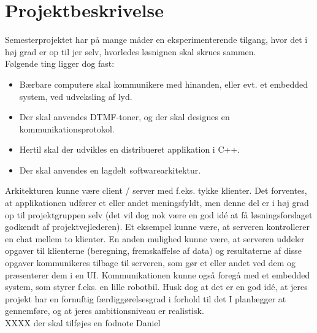 \section{Projektbeskrivelse}
Semesterprojektet har på mange måder en eksperimenterende tilgang, hvor det i høj grad er op til jer selv, hvorledes løsnignen skal skrues sammen.\\

Følgende ting ligger dog fast:
\begin{itemize}[noitemsep]
  \item Bærbare computere skal kommunikere med hinanden, eller evt. et embedded system, ved udveksling af lyd.
  \item Der skal anvendes DTMF-toner, og der skal designes en kommunikationsprotokol.
  \item Hertil skal der udvikles en distribueret applikation i C++.
  \item Der skal anvendes en lagdelt softwarearkitektur.
\end{itemize}

Arkitekturen kunne være client / server med f.eks. tykke klienter.
Det forventes, at applikationen udfører et eller andet meningsfyldt, men denne del er i høj grad op til projektgruppen selv (det vil dog nok være en god idé at få løsningsforslaget godkendt af projektvejlederen). Et eksempel kunne være, at serveren kontrollerer en chat mellem to klienter. En anden mulighed kunne være, at serveren uddeler opgaver til klienterne (beregning, fremskaffelse af data) og resultaterne af disse opgaver kommunikeres tilbage til serveren, som gør et eller andet ved dem og præsenterer dem i en UI. Kommunikationen kunne også foregå med et embedded system, som styrer f.eks. en lille robotbil. Husk dog at det er en god idé, at jeres projekt har en fornuftig færdiggørelsesgrad i forhold til det I planlægger at gennemføre, og at jeres ambitionsniveau er realistisk.\\

XXXX der skal tilføjes en fodnote Daniel
